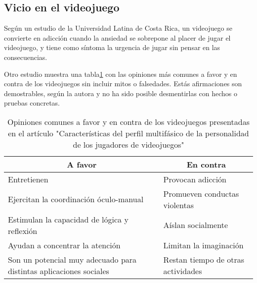 \subsection{Vicio en el videojuego}\label{vicioVJ}


Según un estudio de la Universidad Latina de Costa Rica\cite{quinteroscaracteristicas}, 
un videojuego se convierte en adicción cuando la ansiedad se sobrepone al placer de jugar el videojuego,
y tiene como síntoma la urgencia de jugar sin pensar en las consecuencias.

Otro estudio %
muestra una tabla\ref{tab:tablaOpinión} con las opiniones más comunes a favor 
y en contra de los videojuegos sin incluir mitos o falsedades. 
Estás afirmaciones son demostrables, según la autora y no ha sido posible desmentirlas 
con hechos o pruebas concretas.


\begin{table}[]
	\centering
\caption{Opiniones comunes a favor y en contra de los videojuegos presentadas en el artículo 
"Características del perfil multifásico de la personalidad de los jugadores de videojuegos"}
\label{tab:tablaOpinión}
	\begin{tabular}{|l|l|}
		\hline
		\multicolumn{1}{|c|}{\textbf{A favor}}                             & \multicolumn{1}{c|}{\textbf{En contra}} \\ \hline
		Entretienen                                                        & Provocan adicción                       \\ \hline
		Ejercitan la coordinación óculo-manual                             & Promueven conductas violentas           \\ \hline
		Estimulan la capacidad de lógica y reflexión                       & Aíslan socialmente                      \\ \hline
		Ayudan a concentrar la atención                                    & Limitan la imaginación                  \\ \hline
		Son un potencial muy adecuado para distintas aplicaciones sociales & Restan tiempo de otras actividades      \\ \hline
	\end{tabular}
\end{table}
	
